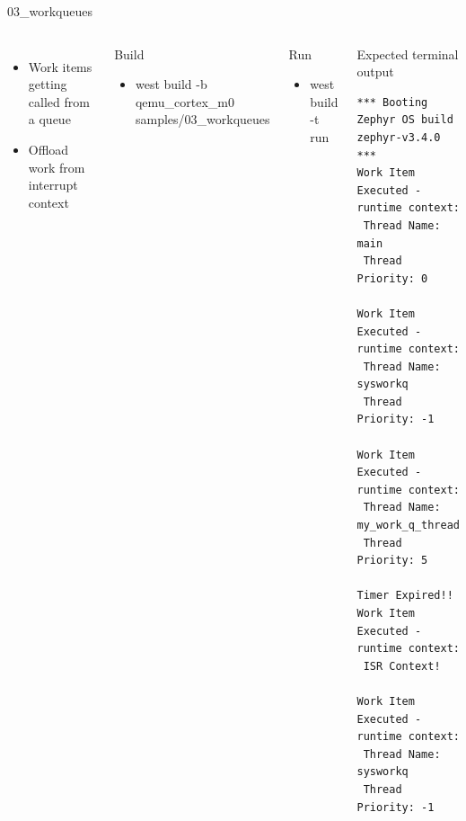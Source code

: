 \documentclass[10pt, aspectratio=169]{beamer}
\begin{document}
\begin{frame}[fragile]{03\_workqueues}

  \begin{columns}[T,onlytextwidth]
      \begin{itemize}
         \item Work items getting called from a queue
         \item Offload work from interrupt context
      \end{itemize}
      \begin{block}{Build}
        \begin{itemize}
          \item {\scriptsize west build -b qemu\_cortex\_m0 samples/03\_workqueues}
        \end{itemize}
      \end{block}

     \begin{block}{Run}
        \begin{itemize}
          \item {\scriptsize west build -t run}
        \end{itemize}
      \end{block}



      \begin{exampleblock}{Expected terminal output}

        {\fontsize{6}{7}\selectfont
          \begin{verbatim}
*** Booting Zephyr OS build zephyr-v3.4.0 ***
Work Item Executed - runtime context:
 Thread Name: main 
 Thread Priority: 0 

Work Item Executed - runtime context:
 Thread Name: sysworkq 
 Thread Priority: -1 

Work Item Executed - runtime context:
 Thread Name: my_work_q_thread 
 Thread Priority: 5 

Timer Expired!!
Work Item Executed - runtime context:
 ISR Context!

Work Item Executed - runtime context:
 Thread Name: sysworkq 
 Thread Priority: -1
          \end{verbatim}
        }
      \end{exampleblock}
  \end{columns}
\end{frame}
\end{document}
